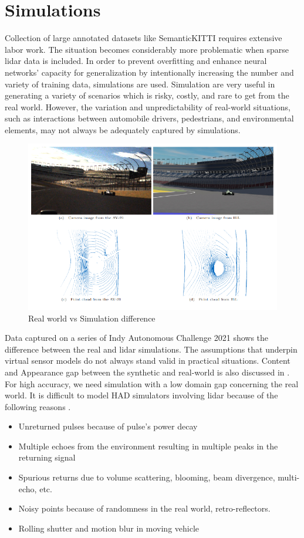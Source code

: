 \section{Simulations}
Collection of large annotated datasets like SemanticKITTI requires extensive labor work\parencite{behley2019semantickitti}. The situation becomes considerably more problematic when sparse lidar data is included. In order to prevent overfitting and enhance neural networks' capacity for generalization by intentionally increasing the number and variety of training data, simulations are used. Simulation are very useful in generating a variety of scenarios which is risky, costly, and rare to get from the real world. However, the variation and unpredictability of real-world situations, such as interactions between automobile drivers, pedestrians, and environmental elements, may not always be adequately captured by simulations.
\begin{figure}[htbp]
    \centering
    \includegraphics[width=0.8\linewidth]{97_graphics/related_work/real_vs_simulation_difference.pdf}
    \caption{Real world vs Simulation difference \parencite{sauerbeck_learn_Year}}
    \label{fig:related_work-real_vs_simulation}
\end{figure}

Data captured on a series of Indy Autonomous Challenge 2021 \parencite{sauerbeck_learn_Year} shows the difference between the real and lidar simulations. The assumptions that underpin virtual sensor models do not always stand valid in practical situations. Content and Appearance gap between the synthetic and real-world is also discussed in \parencite{care_real_and_syn_gap}. For high accuracy, we need simulation with a low domain gap concerning the real world. It is difficult to model HAD simulators involving lidar because of the following reasons \parencite{zero_domain_gap}. 
\begin{itemize}
    \item Unreturned pulses because of pulse's power decay
    \item Multiple echoes from the environment resulting in multiple peaks in the returning signal
    \item Spurious returns due to volume scattering, blooming, beam divergence, multi-echo, etc.
    \item Noisy points because of randomness in the real world, retro-reflectors.
    \item Rolling shutter and motion blur in moving vehicle
\end{itemize}

